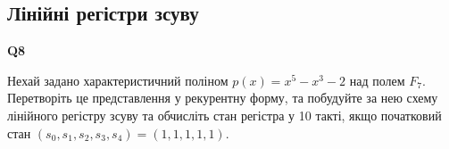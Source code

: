 \documentclass{../../test-template}
\begin{document}
\subsection{Лінійні регістри зсуву}
\begin{tcolorbox}[lowerbox=invisible,colback=white]
    \begin{minipage}{0.1\textwidth}
        \raggedright
        \vspace*{\fill}
            \textbf{Q8}
        \vspace*{\fill}
        \end{minipage}
        \begin{minipage}{0.75\textwidth}
        Нехай задано характеристичний поліном $p(x)=x^5-x^3-2$ над полем $F_7$. Перетворіть це представлення у рекурентну форму, та побудуйте за нею схему лінійного регістру зсуву та обчисліть стан регістра у 10 такті, якщо початковий стан $(s_0,s_1,s_2,s_3,s_4)=(1,1,1,1,1)$.
        \end{minipage}
\end{tcolorbox}
\end{document}
